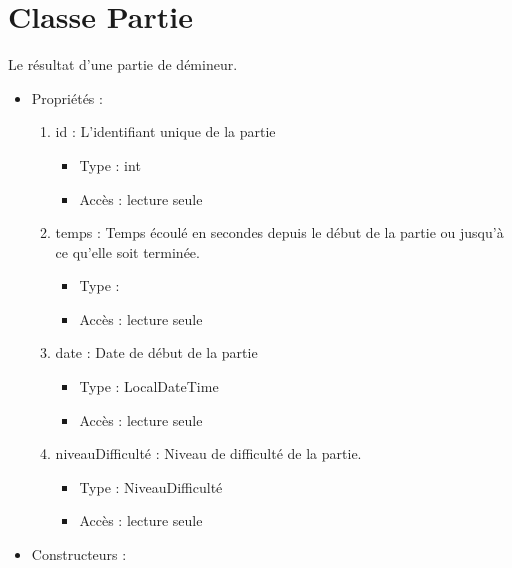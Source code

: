 \section{Classe Partie}

Le résultat d'une partie de démineur.

\begin{itemize}
\item Propriétés : 
  \begin{enumerate}
  \item id : L'identifiant unique de la partie
    \begin{itemize}
    \item Type : int
    \item Accès : lecture seule
    \end{itemize}
  \item temps : Temps écoulé en secondes depuis le début de la partie ou jusqu'à ce qu'elle soit terminée.
    \begin{itemize}
    \item Type : 
    \item Accès : lecture seule
    \end{itemize}
  \item date : Date de début de la partie
    \begin{itemize}
    \item Type : LocalDateTime
    \item Accès : lecture seule
    \end{itemize}
  \item niveauDifficulté : Niveau de difficulté de la partie.
    \begin{itemize}
    \item Type : NiveauDifficulté
    \item Accès : lecture seule
    \end{itemize}

  \end{enumerate}

\item Constructeurs : 


\end{itemize}
